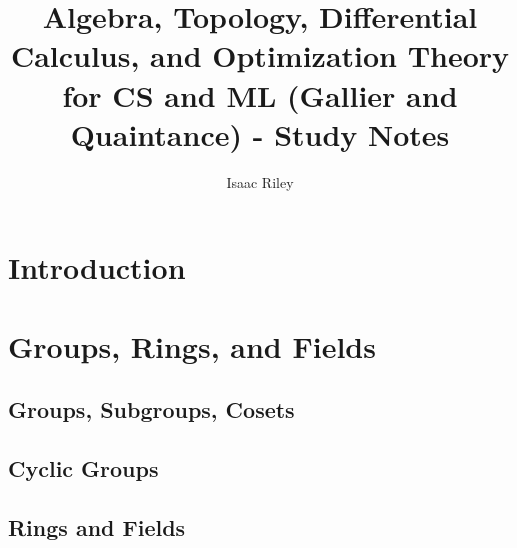 \documentclass[a4paper]{article}
\title{Algebra, Topology, Differential Calculus, and Optimization Theory for CS and ML (Gallier and Quaintance) - Study Notes}
\author{Isaac Riley}
\begin{document}
\maketitle
\tableofcontents
\newpage



\section{Introduction}

\subsection{ }

\subsubsection{}










\newpage
\section{Groups, Rings, and Fields}
\subsection{ Groups, Subgroups, Cosets} %

\subsection{ Cyclic Groups} %

\subsection{ Rings and Fields} %

\newpage
\end{document}
